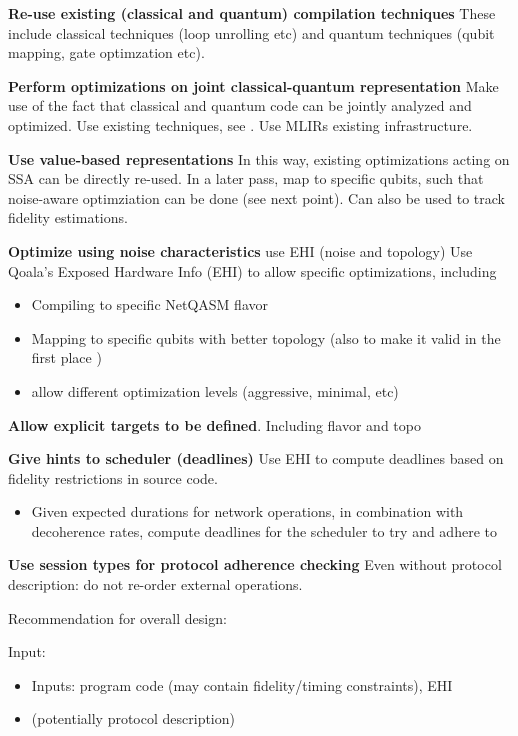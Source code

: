 \textbf{Re-use existing (classical and quantum) compilation techniques}
These include classical techniques (loop unrolling etc) and quantum techniques (qubit mapping, gate optimzation etc).

\textbf{Perform optimizations on joint classical-quantum representation}
Make use of the fact that classical and quantum code can be jointly analyzed and optimized.
Use existing techniques, see .
Use MLIRs existing infrastructure.

\textbf{Use value-based representations}
In this way, existing optimizations acting on SSA can be directly re-used.
In a later pass, map to specific qubits, such that noise-aware optimziation can be done (see next point).
Can also be used to track fidelity estimations.

\textbf{Optimize using noise characteristics} use EHI (noise and topology)
Use Qoala's Exposed Hardware Info (EHI) to allow specific optimizations, including
\begin{itemize}
  \item Compiling to specific NetQASM flavor
  \item Mapping to specific qubits with better topology (also to make it valid in the first place )
  \item allow different optimization levels (aggressive, minimal, etc)
\end{itemize}

\textbf{Allow explicit targets to be defined}. Including flavor and topo

\textbf{Give hints to scheduler (deadlines)}
Use EHI to compute deadlines based on fidelity restrictions in source code.
\begin{itemize}
  \item Given expected durations for network operations, in combination with decoherence rates, compute deadlines for the scheduler to try and adhere to
\end{itemize}


\textbf{Use session types for protocol adherence checking}
Even without protocol description: do not re-order external operations.



Recommendation for overall design:

Input:
\begin{itemize}
  \item Inputs: program code (may contain fidelity/timing constraints), EHI
  \item (potentially protocol description)
\end{itemize}

